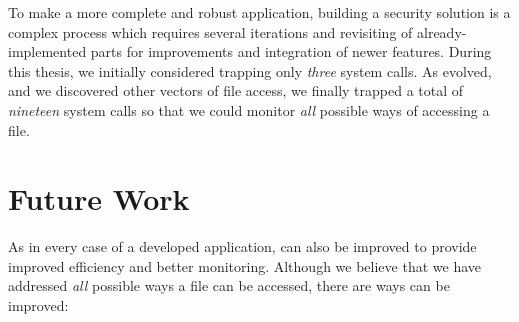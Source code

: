 \par To make a more complete and robust application, building a security solution is a complex process which requires several iterations and revisiting of already-implemented parts for improvements and integration of newer features. During this thesis, we initially considered trapping only \emph{three} system calls. As  evolved, and we discovered other vectors of file access, we finally trapped a total of \emph{nineteen} system calls so that we could monitor \emph{all} possible ways of accessing a file.


\section{Future Work}

\par As in every case of a developed application,  can also be improved to provide improved efficiency and better monitoring. Although we believe that we have addressed \emph{all} possible ways a file can be accessed, there are ways  can be improved:

